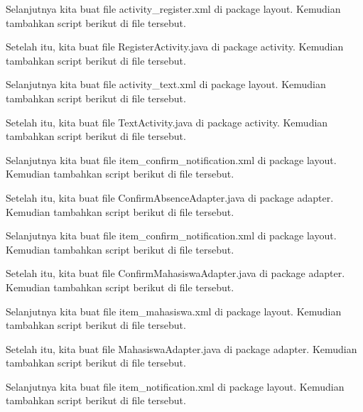 Selanjutnya kita buat file activity\_register.xml di package layout. Kemudian tambahkan script berikut di file tersebut.


Setelah itu, kita buat file RegisterActivity.java di package activity. Kemudian tambahkan script berikut di file tersebut.


Selanjutnya kita buat file activity\_text.xml di package layout. Kemudian tambahkan script berikut di file tersebut.


Setelah itu, kita buat file TextActivity.java di package activity. Kemudian tambahkan script berikut di file tersebut.


Selanjutnya kita buat file item\_confirm\_notification.xml di package layout. Kemudian tambahkan script berikut di file tersebut.


Setelah itu, kita buat file ConfirmAbsenceAdapter.java di package adapter. Kemudian tambahkan script berikut di file tersebut.


Selanjutnya kita buat file item\_confirm\_notification.xml di package layout. Kemudian tambahkan script berikut di file tersebut.


Setelah itu, kita buat file ConfirmMahasiswaAdapter.java di package adapter. Kemudian tambahkan script berikut di file tersebut.


Selanjutnya kita buat file item\_mahasiswa.xml di package layout. Kemudian tambahkan script berikut di file tersebut.


Setelah itu, kita buat file MahasiswaAdapter.java di package adapter. Kemudian tambahkan script berikut di file tersebut.


Selanjutnya kita buat file item\_notification.xml di package layout. Kemudian tambahkan script berikut di file tersebut.


